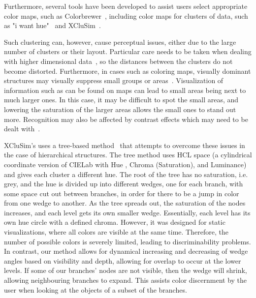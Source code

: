 \documentclass[review,journal]{vgtc}         %
\begin{document}
	Furthermore, several tools have been developed to assist users select appropriate color maps, such as Colorbrewer~\cite{harrower2003colorbrewer}, including color maps for clusters of data, such as "i want hue"~\cite{iwanthue} and XCluSim~\cite{l2015xclusim}. 
	
	Such clustering can, however, cause perceptual issues, either due to the large number of clusters or their layout. 
	Particular care needs to be taken when dealing with higher dimensional data~\cite{mittelstiidt2014revisiting}, so the distances between the clusters do not become distorted. 
	Furthermore, in cases such as coloring maps, visually dominant structures may visually suppress small groups or areas~\cite{lee2013perceptually}.
	Visualization of information such as can be found on maps can lead to small areas being next to much larger ones. 
	In this case, it may be difficult to spot the small areas, and lowering the saturation of the larger areas allows the small ones to stand out more.
	Recognition may also be affected by contrast effects which may need to be dealt with~\cite{mittelstadt2014methods}. 
	
	
	XCluSim’s uses a tree-based method~\cite{tennekes2014tree} that attempts to overcome these issues in the case of hierarchical structures. 
	The tree method uses HCL space (a cylindrical coordinate version of CIELab with Hue , Chroma (Saturation), and Luminance) and gives each cluster a different hue. 
	The root of the tree has no saturation, i.e. grey, and the hue is divided up into different wedges, one for each branch, with some space cut out between branches, in order for there to be a jump in color from one wedge to another. 
	As the tree spreads out, the saturation of the nodes increases, and each level gets its own smaller wedge. 
	Essentially, each level has its own hue circle with a defined chroma. 
	However, it was designed for static visualizations, where all colors are visible at the same time. Therefore, the number of possible colors is severely limited, leading to discriminability problems.
	In contrast, our method allows for dynamical increasing and decreasing of wedge angles based on visibility and depth, allowing for overlap to occur at the lower levels. 
	If some of our branches' nodes are not visible, then the wedge will shrink, allowing neighbouring branches to expand. 
	This assists color discernment by the user when looking at the objects of a subset of the branches.
	
\end{document}
